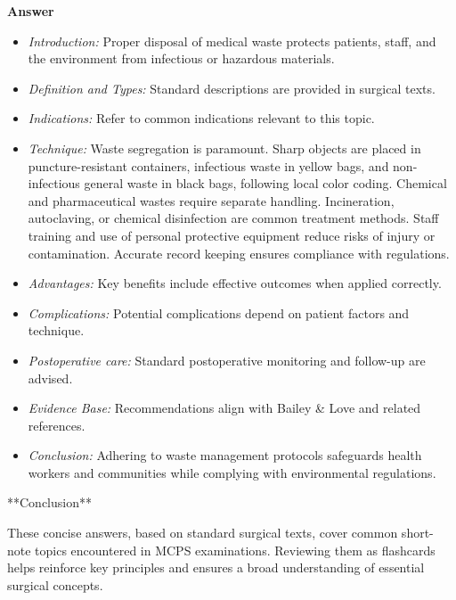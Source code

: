 \documentclass{article}
\begin{document}
\textbf{Answer}
\begin{itemize}

\item \emph{Introduction:} Proper disposal of medical waste protects patients, staff, and the environment from infectious or hazardous materials.
\item \emph{Definition and Types:} Standard descriptions are provided in surgical texts.
\item \emph{Indications:} Refer to common indications relevant to this topic.

\item \emph{Technique:} Waste segregation is paramount. Sharp objects are placed in puncture-resistant containers, infectious waste in yellow bags, and non-infectious general waste in black bags, following local color coding. Chemical and pharmaceutical wastes require separate handling. Incineration, autoclaving, or chemical disinfection are common treatment methods. Staff training and use of personal protective equipment reduce risks of injury or contamination. Accurate record keeping ensures compliance with regulations.
\item \emph{Advantages:} Key benefits include effective outcomes when applied correctly.
\item \emph{Complications:} Potential complications depend on patient factors and technique.
\item \emph{Postoperative care:} Standard postoperative monitoring and follow-up are advised.
\item \emph{Evidence Base:} Recommendations align with Bailey \& Love and related references.

\item \emph{Conclusion:} Adhering to waste management protocols safeguards health workers and communities while complying with environmental regulations.


\end{itemize}

**Conclusion**

These concise answers, based on standard surgical texts, cover common short-note topics encountered in MCPS examinations. Reviewing them as flashcards helps reinforce key principles and ensures a broad understanding of essential surgical concepts.
\end{document}
